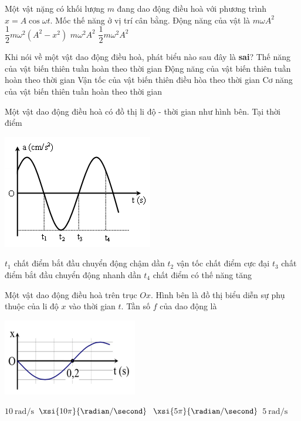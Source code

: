\begin{ex}
	Một vật nặng có khối lượng $m$ đang dao động điều hoà với phương trình $x=A\cos\omega t$. Mốc thế năng ở vị trí cân bằng. Động năng của vật là
	\choice
	{$m\omega A^2$}
	{\True $\dfrac{1}{2}m\omega^2\left(A^2-x^2\right)$}
	{$m\omega^2A^2$}
	{$\dfrac{1}{2}m\omega^2A^2$}
	\loigiai{}
\end{ex}
\begin{ex}
	Khi nói về một vật dao động điều hoà, phát biểu nào sau đây là \textbf{sai}?
	\choice
	{Thế năng của vật biến thiên tuần hoàn theo thời gian}
	{Động năng của vật biến thiên tuần hoàn theo thời gian}
	{Vận tốc của vật biến thiên điều hòa theo thời gian}
	{\True Cơ năng của vật biến thiên tuần hoàn theo thời gian}
\end{ex}
\begin{ex}
Một vật dao động điều hoà có đồ thị li độ - thời gian như hình bên. Tại thời điểm
\begin{center}
	\includegraphics[width=0.4\linewidth]{../figs/C1-Q-4}
\end{center}	
	\choice
	{\True $t_1$ chất điểm bắt đầu chuyển động chậm dần}
	{$t_2$ vận tốc chất điểm cực đại}
	{$t_3$ chất điểm bắt đầu chuyển động nhanh dần}
	{$t_4$ chất điểm có thế năng tăng}
\end{ex}
\begin{ex}
Một vật dao động điều hoà trên trục $Ox$. Hình bên là đồ thị biểu diễn sự phụ thuộc của li độ $x$ vào thời gian $t$. Tần số $f$ của dao động là
\begin{center}
	\includegraphics[width=0.3\linewidth]{../figs/C1-Q-1}
\end{center}	
	\choice
	{$\SI{10}{\radian/\second}$}
	{$\xsi{10\pi}{\radian/\second}$}
	{\True $\xsi{5\pi}{\radian/\second}$}
	{$\SI{5}{\radian/\second}$}
\end{ex}
